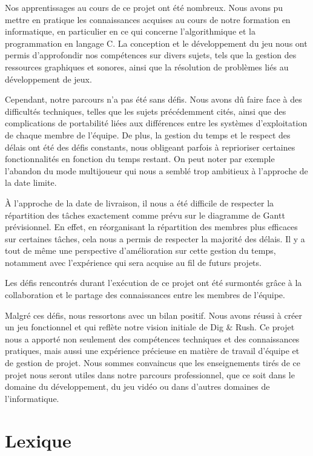 \documentclass[a4paper,12pt]{article}
\begin{document}
Nos apprentissages au cours de ce projet ont été nombreux. Nous avons pu mettre en pratique les connaissances acquises au cours de notre formation en informatique, en particulier en ce qui concerne l’algorithmique et la programmation en langage C. 
La conception et le développement du jeu nous ont permis d’approfondir nos compétences sur divers sujets, tels que la gestion des ressources graphiques et sonores, ainsi que la résolution de problèmes liés au développement de jeux.

Cependant, notre parcours n’a pas été sans défis. Nous avons dû faire face à des diﬀicultés techniques, telles que les sujets précédemment cités, ainsi que des complications de portabilité liées aux différences entre les systèmes d’exploitation de chaque membre de l’équipe. De plus, la gestion du temps et le respect des délais ont été des défis constants, nous obligeant parfois à reprioriser certaines fonctionnalités en fonction du temps restant. 
On peut noter par exemple l’abandon du mode multijoueur qui nous a semblé trop ambitieux à l’approche de la date limite. 

À l’approche de la date de livraison, il nous a été diﬀicile de respecter la répartition des tâches exactement comme prévu sur le diagramme de Gantt prévisionnel. 
En effet, en réorganisant la répartition des membres plus eﬀicaces sur certaines tâches, cela nous a permis de respecter la majorité des délais. Il y a tout de même une perspective d’amélioration sur cette gestion du temps, notamment avec l’expérience qui sera acquise au fil de futurs projets.

Les défis rencontrés durant l’exécution de ce projet ont été surmontés grâce à la collaboration et le partage des connaissances entre les membres de l’équipe.

Malgré ces défis, nous ressortons avec un bilan positif. Nous avons réussi à créer un jeu fonctionnel et qui reflète notre vision initiale de Dig \& Rush. 
Ce projet nous a apporté non seulement des compétences techniques et des connaissances pratiques, mais aussi une expérience précieuse en matière de travail d’équipe et de gestion de projet. 
Nous sommes convaincus que les enseignements tirés de ce projet nous seront utiles dans notre parcours professionnel, que ce soit dans le domaine du développement, du jeu vidéo ou dans d’autres domaines de l’informatique.



\newpage
\appendix

\section{Lexique}
\end{document}
